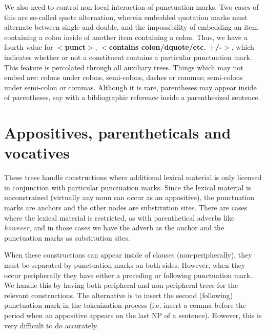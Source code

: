 We also need to control non-local interaction of punctuation 
marks. Two cases of this are so-called quote alternation, wherein 
embedded quotation marks must alternate between single and double, and 
the impossibility of embedding an item containing a colon inside of 
another item containing a colon. Thus, we have a fourth value for {\bf $<$punct$>$}, {\bf $<$contains colon/dquote/etc. +/-$>$}, which 
indicates whether or not a constituent contains a particular 
punctuation mark. This feature is percolated through all auxiliary 
trees.  Things which may not embed are: colons under colons, 
semi-colons, dashes or commas; semi-colons under semi-colon or commas. 
Although it is rare, parentheses may appear inside of parentheses, say 
with a bibliographic reference inside a parenthesized sentence. 
 
 
 
\section{Appositives, parentheticals and vocatives} 
 
These trees handle constructions where additional lexical material is 
only licensed in conjunction with particular punctuation marks. Since 
the lexical material is unconstrained (virtually any noun can occur as 
an appositive), the punctuation marks are anchors and the other nodes 
are substitution sites. There are cases where the lexical material is 
restricted, as with parenthetical adverbs like {\it however}, and in 
those cases we have the adverb as the anchor and the punctuation marks 
as substitution sites. 
 
When these constructions can appear inside of clauses 
(non-peripherally), they must be separated by punctuation marks on 
both sides. However, when they occur peripherally they have either a 
preceding or following punctuation mark. We handle this by having 
both peripheral and non-peripheral trees for the relevant 
constructions. The alternative is to insert the second (following) 
punctuation mark in the tokenization process (i.e. insert a comma 
before the period when an appositive appears on the last NP of a 
sentence). However, this is very difficult to do accurately. 
 
